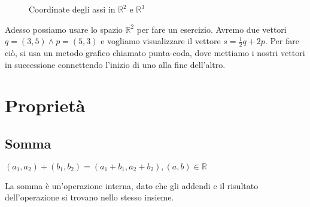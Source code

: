 \begin{figure}[H]
  \centering
  \caption[Caption]{Coordinate degli assi in $\mathbb{R}^{2}$ e
  $\mathbb{R}^{3}$}
  \label{fig:pianocartesiano}
\end{figure}

\newpage

Adesso possiamo usare lo spazio $\mathbb{R}^{2}$ per fare un
esercizio. Avremo due vettori $q=(3,5)\wedge p=(5,3)$ e vogliamo
visualizzare il vettore $s=\frac{1}{2}q+2p$. Per fare ciò, si usa un
metodo grafico chiamato punta-coda, dove mettiamo i nostri vettori in
successione connettendo l'inizio di uno alla fine dell'altro.

\begin{figure}[H]
  \centering
  \caption[Caption]{}
  \label{fig:sommavettori}
\end{figure}

\section{Proprietà}

\subsection{Somma}

\begin{definizione}
  $(a_{1}, a_{2})+(b_{1},b_{2})=(a_{1}+b_{1}, a_{2}+b_{2}), (a, b)\in
  \mathbb{R}$
\end{definizione}

La somma è un'operazione interna, dato che gli addendi e il risultato
dell'operazione si trovano nello stesso insieme.

